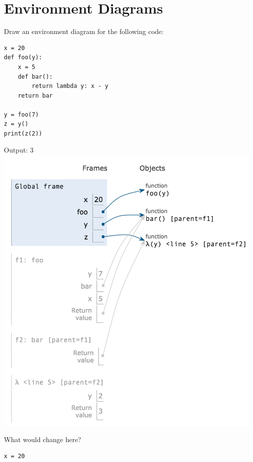 \documentclass{exam}
\begin{document}
\section{Environment Diagrams}
\begin{questions}
\begin{blocksection}
\question Draw an environment diagram for the following code:

\begin{lstlisting}
x = 20
def foo(y):
    x = 5
    def bar():
        return lambda y: x - y
    return bar

y = foo(7)
z = y()
print(z(2))
\end{lstlisting}

\begin{solution}[2in]
    Output: 3 \newline
    \includegraphics[scale=0.5]{img/foobar.png}
\end{solution}
\end{blocksection}

\begin{blocksection}
\question What would change here?

\begin{lstlisting}
x = 20


\end{lstlisting}
\end{blocksection}
\end{questions}
\end{document}
